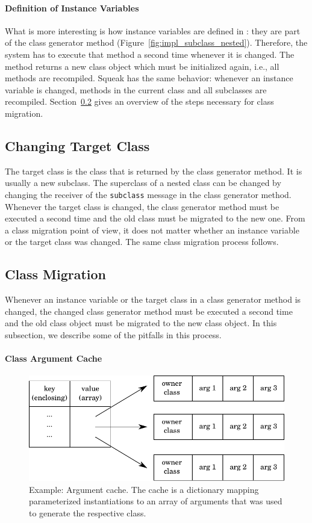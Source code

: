 \paragraph{Definition of Instance Variables}
What is more interesting is how instance variables are defined in \msname: they are part of the class generator method (Figure~\ref{fig:impl_subclass_nested}). Therefore, the system has to execute that method a second time whenever it is changed. The method returns a new class object which must be initialized again, i.e., all methods are recompiled. Squeak has the same behavior: whenever an instance variable is changed, methods in the current class and all subclasses are recompiled. Section~\ref{sec:impl_migration} gives an overview of the steps necessary for class migration.

\subsection{Changing Target Class}
The target class is the class that is returned by the class generator method. It is usually a new subclass. The superclass of a nested class can be changed by changing the receiver of the \texttt{subclass} message in the class generator method. Whenever the target class is changed, the class generator method must be executed a second time and the old class must be migrated to the new one. From a class migration point of view, it does not matter whether an instance variable or the target class was changed. The same class migration process follows.

\subsection{Class Migration}
\label{sec:impl_migration}
Whenever an instance variable or the target class in a class generator method is changed, the changed class generator method must be executed a second time and the old class object must be migrated to the new class object. In this subsection, we describe some of the pitfalls in this process.

\paragraph{Class Argument Cache}
\label{sec:impl_cls_arg_cache_subsec}
\begin{figure}[!htp]
	\centering
	\includegraphics[scale=0.7]{arg_cache.pdf}
	\caption[Example: Argument cache]{Example: Argument cache. The cache is a dictionary mapping parameterized instantiations to an array of arguments that was used to generate the respective class.}
	\label{fig:impl_arg_cache}
\end{figure}

